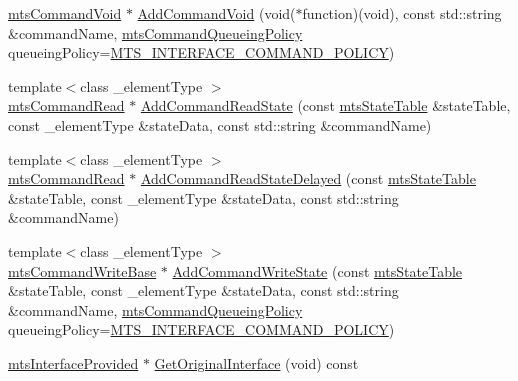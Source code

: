 \begin{DoxyCompactItemize}
\item 
\hyperlink{classmts_command_void}{mts\-Command\-Void} $\ast$ \hyperlink{classmts_interface_provided_a224ba8ebb6bf7ad3cf8836602c333844}{Add\-Command\-Void} (void($\ast$function)(void), const std\-::string \&command\-Name, \hyperlink{mts_forward_declarations_8h_aa2ac24035e136fa1689dcc2854c63fc7}{mts\-Command\-Queueing\-Policy} queueing\-Policy=\hyperlink{mts_forward_declarations_8h_aa2ac24035e136fa1689dcc2854c63fc7a4f444b4120a5e2efd084e2e5a214f5c8}{M\-T\-S\-\_\-\-I\-N\-T\-E\-R\-F\-A\-C\-E\-\_\-\-C\-O\-M\-M\-A\-N\-D\-\_\-\-P\-O\-L\-I\-C\-Y})
\item 
{\footnotesize template$<$class \-\_\-element\-Type $>$ }\\\hyperlink{classmts_command_read}{mts\-Command\-Read} $\ast$ \hyperlink{classmts_interface_provided_a6787568d03845678e7edff0609ff23b6}{Add\-Command\-Read\-State} (const \hyperlink{classmts_state_table}{mts\-State\-Table} \&state\-Table, const \-\_\-element\-Type \&state\-Data, const std\-::string \&command\-Name)
\item 
{\footnotesize template$<$class \-\_\-element\-Type $>$ }\\\hyperlink{classmts_command_read}{mts\-Command\-Read} $\ast$ \hyperlink{classmts_interface_provided_af576c4316302019d7fbb8b4f3d5da48d}{Add\-Command\-Read\-State\-Delayed} (const \hyperlink{classmts_state_table}{mts\-State\-Table} \&state\-Table, const \-\_\-element\-Type \&state\-Data, const std\-::string \&command\-Name)
\item 
{\footnotesize template$<$class \-\_\-element\-Type $>$ }\\\hyperlink{classmts_command_write_base}{mts\-Command\-Write\-Base} $\ast$ \hyperlink{classmts_interface_provided_ae415090b8ecf1ad0311c532c00b37f1a}{Add\-Command\-Write\-State} (const \hyperlink{classmts_state_table}{mts\-State\-Table} \&state\-Table, const \-\_\-element\-Type \&state\-Data, const std\-::string \&command\-Name, \hyperlink{mts_forward_declarations_8h_aa2ac24035e136fa1689dcc2854c63fc7}{mts\-Command\-Queueing\-Policy} queueing\-Policy=\hyperlink{mts_forward_declarations_8h_aa2ac24035e136fa1689dcc2854c63fc7a4f444b4120a5e2efd084e2e5a214f5c8}{M\-T\-S\-\_\-\-I\-N\-T\-E\-R\-F\-A\-C\-E\-\_\-\-C\-O\-M\-M\-A\-N\-D\-\_\-\-P\-O\-L\-I\-C\-Y})
\item 
\hyperlink{classmts_interface_provided}{mts\-Interface\-Provided} $\ast$ \hyperlink{classmts_interface_provided_abf0474e52ed990b26e066cdd8389d2ce}{Get\-Original\-Interface} (void) const 
\item 

\end{DoxyCompactItemize}
